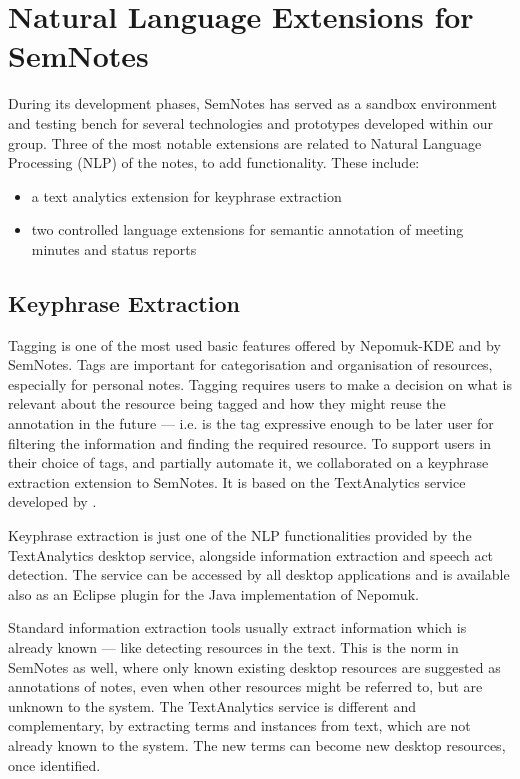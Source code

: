 \section{Natural Language Extensions for SemNotes}
\label{sec:nlpsemnotes}

During its development phases, SemNotes has served as a sandbox environment and testing bench for several technologies and prototypes developed within our group. Three of the most notable extensions are related to Natural Language Processing (NLP) of the notes, to add functionality. These include: 
\begin{itemize}
 \item a text analytics extension for keyphrase extraction \cite{Schutz2008}
 \item two controlled language extensions for semantic annotation of meeting minutes and status reports \cite{Davis2008,Davis2009}
\end{itemize}

\subsection{Keyphrase Extraction}

Tagging is one of the most used basic features offered by Nepomuk-KDE and by SemNotes. Tags are important for categorisation and organisation of resources, especially for personal notes. Tagging requires users to make a decision on what is relevant about the resource being tagged and how they might reuse the annotation in the future --- i.e. is the tag expressive enough to be later user for filtering the information and finding the required resource. To support users in their choice of tags, and partially automate it, we collaborated on a keyphrase extraction extension to SemNotes. It is based on the TextAnalytics service developed by \cite{Schutz2008}. 

Keyphrase extraction is just one of the NLP functionalities provided by the Text\-Analytics desktop service, alongside information extraction and speech act detection. The service can be accessed by all desktop applications and is available also as an Eclipse plugin for the Java implementation of Nepomuk.

Standard information extraction tools usually extract information which is already known --- like detecting resources in the text. This is the norm in SemNotes as well, where only known existing desktop resources are suggested as annotations of notes, even when other resources might be referred to, but are unknown to the system. The TextAnalytics service is different and complementary, by extracting terms and instances from text, which are not already known to the system. The new terms can become new desktop resources, once identified.


